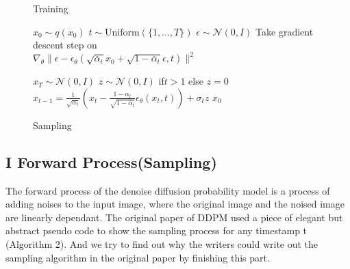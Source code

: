 \documentclass{article}
\begin{document}
\begin{figure*}[ht]
    \centering
    \begin{minipage}{0.48\textwidth}
        \begin{algorithm}[H]
            \caption{Training}
            \begin{algorithmic}[1]
                \REPEAT
                    \STATE $x_{0} \sim q(x_{0})$
                    \STATE $t \sim \text{Uniform}(\{1, \ldots, T\})$
                    \STATE $\epsilon \sim \mathcal{N}(0, I)$
                    \STATE Take gradient descent step on \\
                    \quad $\nabla_{\theta} \|\epsilon - \epsilon_{\theta}(\sqrt{\bar{\alpha}_{t}}x_{0} + \sqrt{1 - \bar{\alpha}_{t}}\epsilon, t)\|^{2}$
            \end{algorithmic}
        \end{algorithm}
    \end{minipage}\hfill
    \begin{minipage}{0.48\textwidth}
        \begin{algorithm}[H]
            \caption{Sampling}
            \begin{algorithmic}[1]
                \STATE $x_{T} \sim \mathcal{N}(0, I)$
                    \STATE $z \sim \mathcal{N}(0, I)$ if{$t > 1$} else $z = 0$
                    \STATE $x_{t-1} = \frac{1}{\sqrt{\alpha_{t}}}\left(x_{t} - \frac{1 - \alpha_{t}}{\sqrt{1 - \bar{\alpha}_{t}}}\epsilon_{\theta}(x_{t}, t)\right) + \sigma_{t} z$
                \ENDFOR
                \RETURN $x_{0}$
            \end{algorithmic}
        \end{algorithm}
    \end{minipage}
\end{figure*}

\subsection*{I Forward Process(Sampling)}

\begin{flushleft}
    The forward process of the denoise diffusion probability model is a process of adding noises to the input image, where the original image and the noised image are linearly dependant. 
    The original paper of DDPM used a piece of elegant but abstract pseudo code to show the sampling process for any timestamp t (Algorithm 2). 
    And we try to find out why the writers could write out the sampling algorithm in the original paper by finishing this part.
\end{flushleft}
\end{document}
